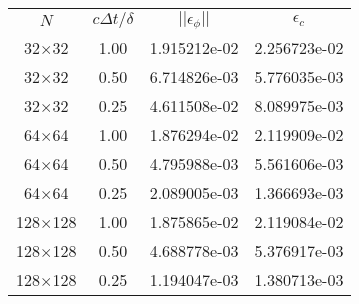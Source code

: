 \begin{tabular}{cccc}
     $N$ & $c\Delta t/\delta$  & $||\epsilon_{\phi}||$ & $\epsilon_{c}$  \\
32$\times$32 & 1.00 & 1.915212e-02 & 2.256723e-02  \\
32$\times$32 & 0.50 & 6.714826e-03 & 5.776035e-03  \\
32$\times$32 & 0.25 & 4.611508e-02 & 8.089975e-03  \\
64$\times$64 & 1.00 & 1.876294e-02 & 2.119909e-02  \\
64$\times$64 & 0.50 & 4.795988e-03 & 5.561606e-03  \\
64$\times$64 & 0.25 & 2.089005e-03 & 1.366693e-03  \\
128$\times$128 & 1.00 & 1.875865e-02 & 2.119084e-02  \\
128$\times$128 & 0.50 & 4.688778e-03 & 5.376917e-03  \\
128$\times$128 & 0.25 & 1.194047e-03 & 1.380713e-03  \\
\end{tabular}
